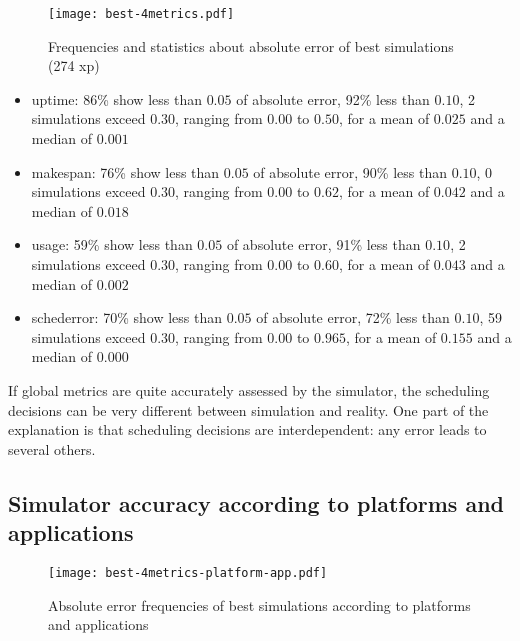 \documentclass[a4paper,10pt]{article}
\newcommand\vrpath{../../lab/setup/simschlouder/validation-results/}
\begin{document}
\begin{figure}
  \centering

  \texttt{[image: best-4metrics.pdf]}
  
  
  
\caption{Frequencies and statistics about absolute error of best simulations (274 xp)}
\end{figure} 

 


\begin{itemize}
 \item uptime: 
      86\% show less than $0.05$ of absolute error, 
      92\% less than $0.10$, 
      2 simulations exceed $0.30$,
      ranging from $0.00$ to $0.50$, for a mean of $0.025$ and a median of $0.001$
 \item makespan: 
      76\% show less than $0.05$ of absolute error, 
      90\% less than $0.10$, 
      0 simulations exceed $0.30$,
      ranging from $0.00$ to $0.62$, for a mean of $0.042$ and a median of $0.018$
 \item usage: 
      59\% show less than $0.05$ of absolute error, 
      91\% less than $0.10$, 
      2 simulations exceed $0.30$,
      ranging from $0.00$ to $0.60$, for a mean of $0.043$ and a median of $0.002$
 \item schederror: 
      70\% show less than $0.05$ of absolute error, 
      72\% less than $0.10$, 
      59 simulations exceed $0.30$,
      ranging from $0.00$ to $0.965$, for a mean of $0.155$ and a median of $0.000$
\end{itemize}

If global metrics are quite accurately assessed by the simulator, 
the scheduling decisions can be very different between simulation and reality. 
One part of the explanation is that scheduling decisions are interdependent: 
any error leads to several others.


\subsection{Simulator accuracy according to platforms and applications}


\begin{figure}
  \texttt{[image: best-4metrics-platform-app.pdf]}
\caption{Absolute error frequencies of best simulations according to platforms 
and applications}
\end{figure} 
\end{document}

